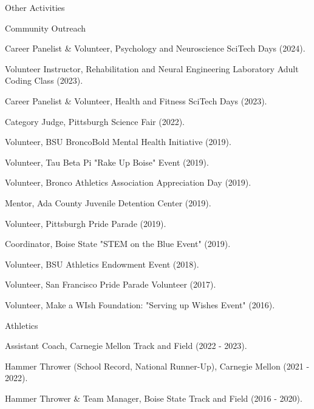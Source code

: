 \documentclass{resume} %
\begin{document}
\begin{rSection}{Other Activities}
\begin{rSubsection2}{Community Outreach}{}{}{}
\item Career Panelist \& Volunteer, Psychology and Neuroscience SciTech Days (2024).
\item Volunteer Instructor, Rehabilitation and Neural Engineering Laboratory Adult Coding Class (2023).
\item Career Panelist \& Volunteer, Health and Fitness SciTech Days (2023).
\item Category Judge, Pittsburgh Science Fair (2022).
\item Volunteer, BSU BroncoBold Mental Health Initiative (2019). 
\item Volunteer, Tau Beta Pi "Rake Up Boise" Event (2019).
\item Volunteer, Bronco Athletics Association Appreciation Day (2019).
\item Mentor, Ada County Juvenile Detention Center (2019).
\item Volunteer, Pittsburgh Pride Parade (2019).
\item Coordinator, Boise State "STEM on the Blue Event" (2019).
\item Volunteer, BSU Athletics Endowment Event (2018).
\item Volunteer, San Francisco Pride Parade Volunteer (2017).
\item Volunteer, Make a WIsh Foundation: "Serving up Wishes Event" (2016). 
\end{rSubsection2}
\begin{rSubsection2}{Athletics}{}{}{}
\item Assistant Coach, Carnegie Mellon Track and Field (2022 - 2023). 
\item Hammer Thrower (School Record, National Runner-Up), Carnegie Mellon (2021 - 2022).
\item Hammer Thrower \& Team Manager, Boise State Track and Field (2016 - 2020).
\end{rSubsection2}
\end{rSection}







\end{document}
